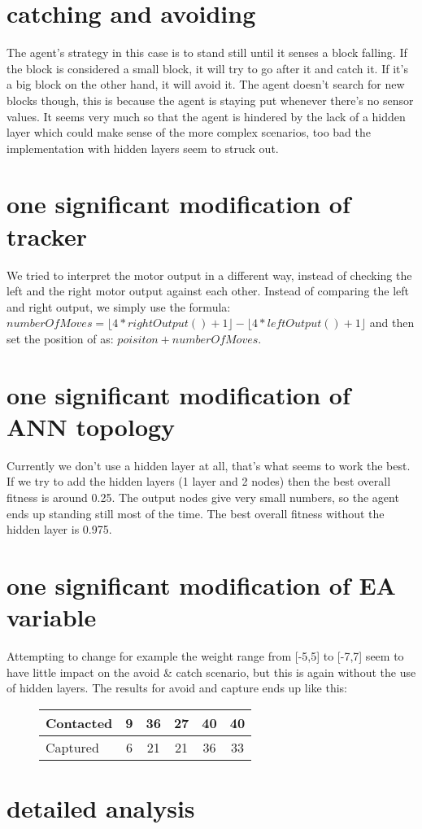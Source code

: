 \documentclass[12pt, a4paper]{article}
\begin{document}
\section{catching and avoiding}
The agent's strategy in this case is to stand still until it senses a block falling. If the block is considered a small block, it will try to go after it and catch it. If it's a big block on the other hand, it will avoid it. The agent doesn't search for new blocks though, this is because the agent is staying put whenever there's no sensor values. It seems very much so that the agent is hindered by the lack of a hidden layer which could make sense of the more complex scenarios, too bad the implementation with hidden layers seem to struck out. 

\section{one significant modification of tracker}
We tried to interpret the motor output in a different way, instead of checking the left and the right motor output against each other. Instead of comparing the left and right output, we simply use the formula:\\ $numberOfMoves = \lfloor 4*rightOutput()+1 \rfloor - \lfloor 4*leftOutput()+1 \rfloor$
and then set the position of as: $ poisiton + numberOfMoves $.

\section{one significant modification of ANN topology}
Currently we don't use a hidden layer at all, that's what seems to work the best. If we try to add the hidden layers (1 layer and 2 nodes) then the best overall fitness is around 0.25. The output nodes give very small numbers, so the agent ends up standing still most of the time. The best overall fitness without the hidden layer is 0.975. 

\section{one significant modification of EA variable}
Attempting to change for example the weight range from [-5,5] to [-7,7] seem to have little impact on the avoid & catch scenario, but this is again without the use of hidden layers. The results for avoid and capture ends up like this:

\begin{figure}[H]
	\begin{center}
		\begin{tabular}{l | c | c |c |c |c }
		 Contacted& 9 & 36 & 27 & 40 & 40\\ \hline
		 Captured & 6 & 21 & 21 & 36 & 33\\
		 
		\end{tabular}
	\end{center}
\end{figure}



\section{detailed analysis}
\end{document}
